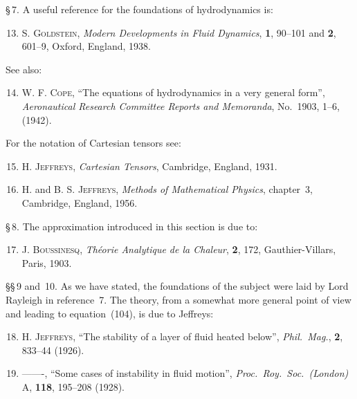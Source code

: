 \noindent \S\,7. A useful reference for the foundations of hydrodynamics is:

\begin{enumerate}
\setcounter{enumi}{12}

\item \textsc{S. Goldstein}, \textit{Modern Developments in Fluid Dynamics},
  \textbf{1}, 90--101 and \textbf{2}, 601--9, Oxford, England, 1938.

\end{enumerate}

\noindent See also:

\begin{enumerate}
\setcounter{enumi}{13}

\item \textsc{W. F. Cope}, ``The equations of hydrodynamics in a very general form'',
  \textit{Aeronautical Research Committee Reports and Memoranda}, No.~1903, 1--6,
  (1942).

\end{enumerate}

\noindent For the notation of Cartesian tensors see:

\begin{enumerate}
\setcounter{enumi}{14}

\item \textsc{H. Jeffreys}, \textit{Cartesian Tensors}, Cambridge, England, 1931.

\item \textsc{H.} and \textsc{B. S. Jeffreys}, \textit{Methods of Mathematical Physics},
  chapter~3, Cambridge, England, 1956.

\end{enumerate}

\noindent \S\,8. The approximation introduced in this section is due to:

\begin{enumerate}
\setcounter{enumi}{16}

\item \textsc{J. Boussinesq}, \textit{Th\'eorie Analytique de la Chaleur}, \textbf{2},
  172, Gauthier-Villars, Paris, 1903.

\end{enumerate}

\noindent \S\S\,9 and~10. As we have stated, the foundations of the subject were laid by Lord
Rayleigh in reference~7. The theory, from a somewhat more general point of
view and leading to equation~(104), is due to Jeffreys:

\begin{enumerate}
\setcounter{enumi}{17}

\item \textsc{H. Jeffreys}, ``The stability of a layer of fluid heated below'',
  \textit{Phil.\ Mag.}, \textbf{2}, 833--44 (1926).

\item -------, ``Some cases of instability in fluid motion'',
  \textit{Proc.\ Roy.\ Soc.\ (London)} A, \textbf{118}, 195--208 (1928).

\end{enumerate}

